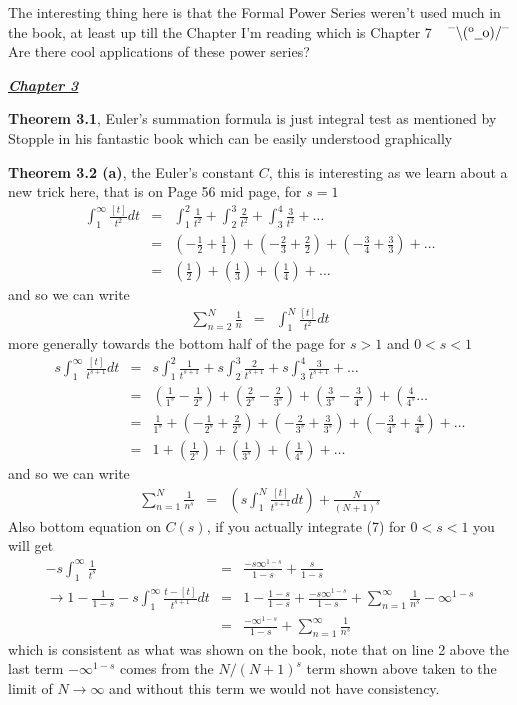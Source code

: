 \documentclass[aps,preprint,preprintnumbers,nofootinbib,showpacs,prd]{revtex4-1}
\newcommand{\nbea}{\begin{eqnarray*}}
\newcommand{\neea}{\end{eqnarray*}}
\newcommand{\dunno}{$ {}^{\mbox {--}}\backslash(^{\rm o}{}\underline{\hspace{0.2cm}}{\rm o})/^{\mbox {--}}$}
\begin{document}
The interesting thing here is that the Formal Power Series weren't used much in the book, at least up till the Chapter I'm reading which is Chapter 7 ~ \dunno Are there cool applications of these power series?





\bigskip
\underline{\textit{\textbf{Chapter 3}}}
\bigskip

{\bf Theorem 3.1}, Euler's summation formula is just integral test as mentioned by Stopple in his fantastic book which can be easily understood graphically

{\bf Theorem 3.2 (a)}, the Euler's constant $C$, this is interesting as we learn about a new trick here, that is on Page 56 mid page, for $s=1$
%
\nbea
\int_1^\infty \frac{[t]}{t^2} dt & = & \int_1^2 \frac{1}{t^2} + \int_2^3 \frac{2}{t^2} + \int_3^4 \frac{3}{t^2} + \ldots \\
& = & \left(-\frac{1}{2} + \frac{1}{1}\right) + \left(-\frac{2}{3} + \frac{2}{2}\right) + \left(-\frac{3}{4} + \frac{3}{3}\right) + \ldots \\
& = & \left(\frac{1}{2}\right) + \left(\frac{1}{3}\right) + \left(\frac{1}{4}\right) + \ldots
\neea
%
and so we can write
%
\nbea
\sum_{n=2}^N \frac{1}{n} & = & \int_1^N \frac{[t]}{t^2} dt
\neea
%
more generally towards the bottom half of the page for $s>1$ and $0 < s < 1$
%
\nbea
s\int_1^\infty \frac{[t]}{t^{s+1}} dt & = & s\int_1^2 \frac{1}{t^{s+1}} + s\int_2^3 \frac{2}{t^{s+1}} + s\int_3^4 \frac{3}{t^{s+1}} + \ldots \\
& = & \left(\frac{1}{1^s}-\frac{1}{2^s}\right) + \left(\frac{2}{2^s}-\frac{2}{3^s}\right) + \left(\frac{3}{3^s}-\frac{3}{4^s}\right) + \left( \frac{4}{4^s}\ldots\right. \\
& = & \frac{1}{1^s} + \left(-\frac{1}{2^s} + \frac{2}{2^s}\right) + \left(-\frac{2}{3^s}+\frac{3}{3^s}\right) + \left(-\frac{3}{4^s}+\frac{4}{4^s}\right) + \ldots \\
& = & 1 + \left(\frac{1}{2^s}\right) + \left(\frac{1}{3^s}\right) + \left(\frac{1}{4^s}\right) + \ldots
\neea
%
and so we can write
%
\nbea
\sum_{n=1}^N \frac{1}{n^s} & = & \left(s\int_1^N \frac{[t]}{t^{s+1}} dt\right) + \frac{N}{(N+1)^s}
\neea
%
Also bottom equation on $C(s)$, if you actually integrate (7) for $0<s<1$ you will get
%
\nbea
-s\int_1^\infty\frac{1}{t^s} & = & \frac{-s\infty^{1-s}}{1-s} + \frac{s}{1-s} \\
\to 1 - \frac{1}{1-s} - s\int_1^\infty\frac{t-[t]}{t^{s+1}} dt & = & 1 - \frac{1-s}{1-s} + \frac{-s\infty^{1-s}}{1-s} + \sum_{n=1}^\infty \frac{1}{n^s} - \infty^{1-s} \\
& = & \frac{-\infty^{1-s}}{1-s} + \sum_{n=1}^\infty \frac{1}{n^s}
\neea
%
which is consistent as what was shown on the book, note that on line 2 above the last term $- \infty^{1-s}$ comes from the $N/(N+1)^s$ term shown above taken to the limit of $N\to\infty$ and without this term we would not have consistency.
\end{document}
